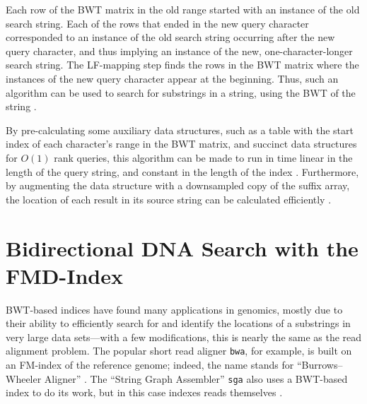 \documentclass[11pt,proposal]{ucthesis}
\begin{document}
Each row of the BWT matrix in the old range started with an instance of the old search string. Each of the rows that ended in the new query character corresponded to an instance of the old search string occurring after the new query character, and thus implying an instance of the new, one-character-longer search string. The LF-mapping step finds the rows in the BWT matrix where the instances of the new query character appear at the beginning. Thus, such an algorithm can be used to search for substrings in a string, using the BWT of the string \cite{ferragina2000opportunistic}.

By pre-calculating some auxiliary data structures, such as a table with the start index of each character's range in the BWT matrix, and succinct data structures for $O(1)$ rank queries, this algorithm can be made to run in time linear in the length of the query string, and constant in the length of the index \cite{ferragina2000opportunistic}. Furthermore, by augmenting the data structure with a downsampled copy of the suffix array, the location of each result in its source string can be calculated efficiently \cite{siren2009run}.


    
    
    
    
        
        

\section{Bidirectional DNA Search with the FMD-Index}

BWT-based indices have found many applications in genomics, mostly due to their ability to efficiently search for and identify the locations of a substrings in very large data sets---with a few modifications, this is nearly the same as the read alignment problem. The popular short read aligner \texttt{bwa}, for example, is built on an FM-index of the reference genome; indeed, the name stands for ``Burrows--Wheeler Aligner'' \cite{li2014bwa,li2009fast}. The ``String Graph Assembler'' \texttt{sga} also uses a BWT-based index to do its work, but in this case indexes reads themselves \cite{simpson2012efficient}.
\end{document}
